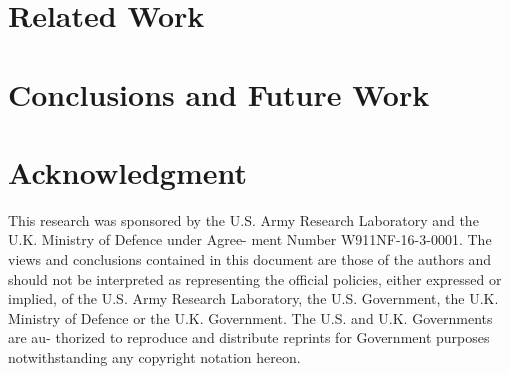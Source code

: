 \documentclass[conference]{IEEEtran}
\begin{document}
\section{Related Work}
\label{sec:related}

\section{Conclusions and Future Work}
\label{sec:conclude}

\section*{Acknowledgment}
This research was sponsored by the U.S. Army Research Laboratory and
the U.K. Ministry of Defence under Agree- ment Number
W911NF-16-3-0001. The views and conclusions contained in this document
are those of the authors and should not be interpreted as representing
the official policies, either expressed or implied, of the U.S. Army
Research Laboratory, the U.S. Government, the U.K. Ministry of Defence
or the U.K. Government. The U.S. and U.K. Governments are au- thorized
to reproduce and distribute reprints for Government purposes
notwithstanding any copyright notation hereon.
 
\end{document}
